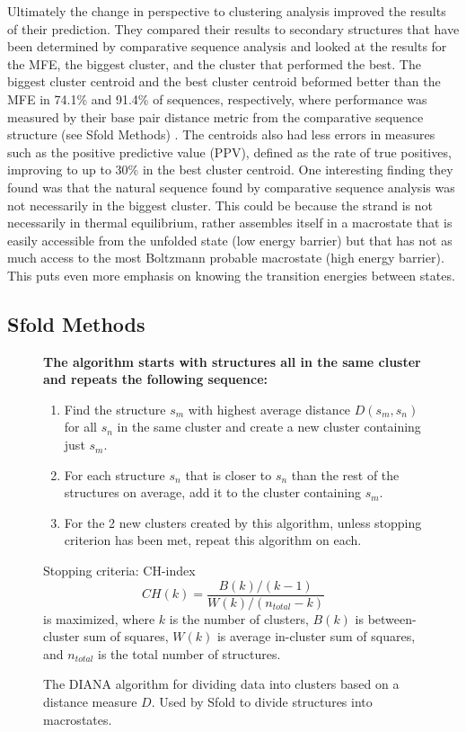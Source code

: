 Ultimately the change in perspective to clustering analysis improved
the results of their prediction. They compared their results to
secondary structures that have been determined by comparative sequence
analysis and looked at the results for the MFE, the biggest cluster,
and the cluster that performed the best. The biggest cluster centroid
and the best cluster centroid beformed better than the MFE in 74.1\%
and 91.4\% of sequences, respectively, where performance was measured
by their base pair distance metric from the comparative sequence
structure (see Sfold Methods) \cite{ding2005rna}
\cite{mathews2006revolutions}. The centroids also had less errors in
measures such as the positive predictive value (PPV), defined as the
rate of true positives, improving to up to 30\% in the best cluster
centroid. One interesting finding they found was that the natural
sequence found by comparative sequence analysis was not necessarily in
the biggest cluster. This could be because the strand is not
necessarily in thermal equilibrium, rather assembles itself in a
macrostate that is easily accessible from the unfolded state (low
energy barrier) but that has not as much access to the most Boltzmann
probable macrostate (high energy barrier). This puts even more
emphasis on knowing the transition energies between states.

\subsection{Sfold Methods}
\begin{figure}[t]
\bf The algorithm starts with structures all in the same cluster and
repeats the following sequence:
\begin{enumerate}
\item Find the structure $s_m$ with highest average distance
  $D(s_m,s_n)$ for all $s_n$ in the same cluster and create a new
  cluster containing just $s_m$.
\item For each structure $s_n$ that is closer to $s_n$ than the rest
  of the structures on average, add it to the cluster containing $s_m$.
\item For the 2 new clusters created by this algorithm, unless
  stopping criterion has been met, repeat this algorithm on each. 
\end{enumerate}
Stopping criteria:
CH-index $$CH(k)=\frac{B(k)/(k-1)}{W(k)/(n_{total}-k)}$$ is maximized,
where $k$ is the number of clusters, $B(k)$ is between-cluster sum of
squares, $W(k)$ is average in-cluster sum of squares, and $n_{total}$
is the total number of structures.
\caption{The DIANA algorithm for dividing data into clusters based on
  a distance measure $D$. Used by Sfold to divide structures into
  macrostates.}
\label{fig:diana-pseudocode}
\end{figure}

